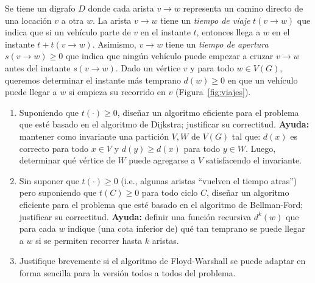 
 
 \item %
 Se tiene un digrafo $D$ donde cada arista $v \to w$ representa un camino directo de una locación $v$ a otra $w$.  La arista $v \to w$ tiene un \emph{tiempo de viaje} $t(v \to w)$ que indica que si un vehículo parte de $v$ en el instante $t$, entonces llega a $w$ en el instante $t + t(v\to w)$.  Asimismo, $v \to w$ tiene un \emph{tiempo de apertura} $s(v \to w) \geq 0$ que indica que ningún vehículo puede empezar a cruzar $v \to w$ antes del instante $s(v \to w)$.  Dado un vértice $v$ y para todo $w \in V(G)$, queremos determinar el instante más temprano $d(w) \geq 0$ en que un vehículo puede llegar a $w$ si empieza su recorrido en $v$ (Figura~\ref{fig:viajes}).
 
 \begin{enumerate}[label=$\alph*$.,ref=$\alph*$]
  \item Suponiendo que $t(\cdot) \geq 0$, diseñar un algoritmo eficiente para el problema que esté basado en el algoritmo de Dijkstra; justificar su correctitud.  \textbf{Ayuda:} mantener como invariante una partición $V, W$ de $V(G)$ tal que: $d(x)$ es correcto para todo $x \in V$ y $d(y) \geq d(x)$ para todo $y \in W$.  Luego, determinar qué vértice de $W$ puede agregarse a $V$ satisfacendo el invariante.
  
  \item Sin suponer que $t(\cdot) \geq 0$ (i.e., algunas aristas ``vuelven el tiempo atras'') pero suponiendo que $t(C) \geq 0$ para todo ciclo $C$, diseñar un algoritmo eficiente para el problema que esté basado en el algoritmo de Bellman-Ford; justificar su correctitud.  \textbf{Ayuda:} definir una función recursiva $d^k(w)$ que para cada $w$ indique (una cota inferior de) qué tan temprano se puede llegar a $w$ si se permiten recorrer hasta $k$ aristas.
  
  \item Justifique brevemente si el algoritmo de Floyd-Warshall se puede adaptar en forma sencilla para la versión todos a todos del problema.
 \end{enumerate}
 
 
